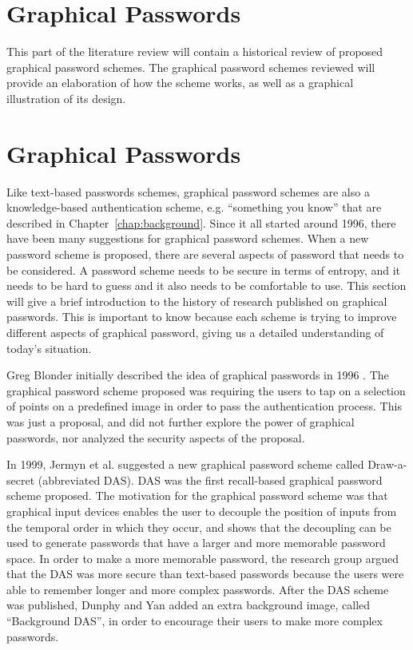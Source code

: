\section{Graphical Passwords}
\label{chapter:literatureReview}

This part of the literature review will contain a historical review of proposed graphical password schemes. The graphical password schemes reviewed will provide an elaboration of how the scheme works, as well as a graphical illustration of its design. 

\section*{Graphical Passwords} \label{sec:literaturegraphicalPasswords}

  Like text-based passwords schemes, graphical password schemes are also a knowledge-based authentication scheme, e.g. ``something you know'' that are described in Chapter~\ref{chap:background}. Since it all started around 1996, there have been many suggestions for graphical password schemes. When a new password scheme is proposed, there are several aspects of password that needs to be considered. A password scheme needs to be secure in terms of entropy, and it needs to be hard to guess and it also needs to be comfortable to use. This section will give a brief introduction to the history of research published on graphical passwords. This is important to know because each scheme is trying to improve different aspects of graphical password, giving us a detailed understanding of today's situation.

  Greg Blonder initially described the idea of graphical passwords in 1996 \cite{Blonder}. The graphical password scheme proposed was requiring the users to tap on a selection of points on a predefined image in order to pass the authentication process. This was just a proposal, and did not further explore the power of graphical passwords, nor analyzed the security aspects of the proposal.

  In 1999, Jermyn et al. \cite{Jermyn} suggested a new graphical password scheme called Draw-a-secret (abbreviated DAS). DAS was the first recall-based graphical password scheme proposed. The motivation for the graphical password scheme was that graphical input devices enables the user to decouple the position of inputs from the temporal order in which they occur, and shows that the decoupling can be used to generate passwords that have a larger and more memorable password space. In order to make a more memorable password, the research group argued that the DAS was more secure than text-based passwords because the users were able to remember longer and more complex passwords. After the DAS scheme was published, Dunphy and Yan \cite{BDAS} added an extra background image, called ``Background DAS'', in order to encourage their users to make more complex passwords.

